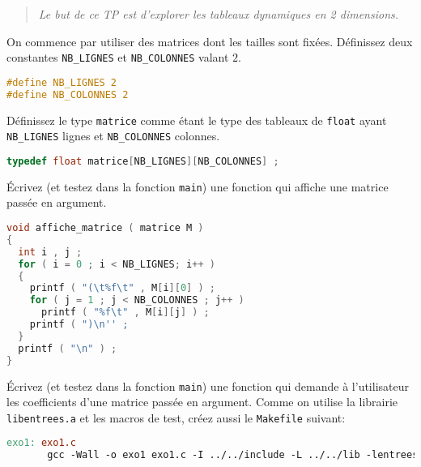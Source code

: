 
\begin{quotation}
  \sl Le but de ce TP est d'explorer les tableaux dynamiques en 2 dimensions.
\end{quotation}


On commence par utiliser des matrices dont les tailles sont
fixées. Définissez deux constantes \texttt{NB\_LIGNES} et
\texttt{NB\_COLONNES} valant \(2\).

\begin{solution}
  \begin{lstlisting}[language=C]
#define NB_LIGNES 2
#define NB_COLONNES 2
  \end{lstlisting}
\end{solution}

\question Définissez le type \texttt{matrice} comme étant le type des tableaux 
de \texttt{float} ayant \texttt{NB\_LIGNES} lignes et
\texttt{NB\_COLONNES} colonnes.

\begin{solution}
  \begin{lstlisting}[language=C]
typedef float matrice[NB_LIGNES][NB_COLONNES] ;
  \end{lstlisting}
\end{solution}

\question Écrivez (et testez dans la fonction \texttt{main}) une
fonction qui affiche une matrice passée en argument. 


\begin{solution}
  \begin{lstlisting}[language=C]
void affiche_matrice ( matrice M )
{
  int i , j ;
  for ( i = 0 ; i < NB_LIGNES; i++ )
  {
    printf ( "(\t%f\t" , M[i][0] ) ;
    for ( j = 1 ; j < NB_COLONNES ; j++ )
      printf ( "%f\t" , M[i][j] ) ;
    printf ( ")\n'' ;
  }
  printf ( "\n" ) ;
}
  \end{lstlisting}
\end{solution}

\question Écrivez (et testez dans la fonction \texttt{main}) une
fonction qui demande à l'utilisateur les coefficients d'une matrice
passée en argument. Comme on utilise la librairie
\texttt{libentrees.a} et les macros de test, créez aussi le
\texttt{Makefile} suivant:

\begin{lstlisting}[language=make]
exo1: exo1.c
       gcc -Wall -o exo1 exo1.c -I ../../include -L ../../lib -lentrees
\end{lstlisting}

